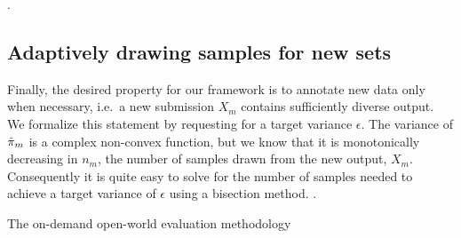 .

\subsection{Adaptively drawing samples for new sets}
Finally, the desired property for our framework is to annotate new data only when necessary, i.e.\ a new submission $X_m$ contains sufficiently diverse output.
We formalize this statement by requesting for a target variance $\epsilon$.
The variance of ${\hat{\pi}}_m$ is a complex non-convex function, but we know that it is monotonically decreasing in $n_m$, the number of samples drawn from the new output, $X_m$.
Consequently it is quite easy to solve for the number of samples needed to achieve a target variance of $\epsilon$ using a bisection method.
.

\begin{algorithm}
  \caption{\label{alg:on-demand-sampling} The on-demand open-world evaluation methodology}
\begin{algorithmic}


  \ENDFOR{}
  \ENDFOR{}
\end{algorithmic}
\end{algorithm}

